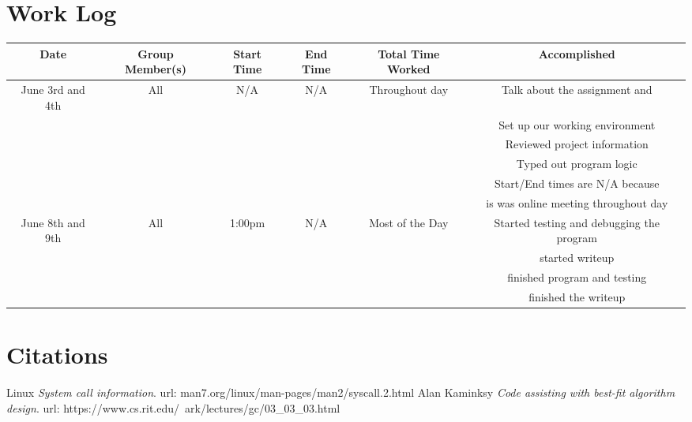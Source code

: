 \section{Work Log}
\begin{center}
\begin{tabular}{ |c|c|c|c|c|c| }
   Date & Group Member(s) & Start Time & End Time & Total Time Worked & Accomplished \\ 
   \hline \hline
   June 3rd and 4th & All & N/A & N/A & Throughout day & Talk about the assignment and\\
    &  &  &  &  & Set up our working environment \\
    &  &  &  &  & Reviewed project information \\
    &  &  &  &  & Typed out program logic \\
    &  &  &  &  & Start/End times are N/A because \\
    &  &  &  &  & is was online meeting throughout day \\
   \hline
   June 8th and 9th & All & 1:00pm & N/A & Most of the Day & Started testing and debugging the program \\
    &  &  &  &  & started writeup \\
    &  &  &  &  & finished program and testing \\
    &  &  &  &  & finished the writeup\\
   \hline
\end{tabular}
\end{center}

\section{Citations}
\begin{thebibliography}{9}
      Linux
      \textit{System call information}.
      url: man7.org/linux/man-pages/man2/syscall.2.html  
      Alan Kaminksy
      \textit{Code assisting with best-fit algorithm design}.
      url: https://www.cs.rit.edu/~ark/lectures/gc/03\_03\_03.html
\end{thebibliography}

